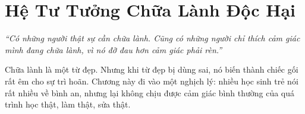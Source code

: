 \chapter{Hệ Tư Tưởng Chữa Lành Độc Hại}

\begin{center}
	\textit{\color{bookprimary}``Có những người thật sự cần chữa lành. Cũng có những người chỉ thích cảm giác mình đang chữa lành, vì nó đỡ đau hơn cảm giác phải rèn.''}
\end{center}

\ngancach

\begin{tcolorbox}[
	colback=booksecondary!8,
	colframe=booksecondary!40,
	arc=5pt,
	title={\bfseries Mở Chương},
	fonttitle=\bfseries\color{booksecondary}
]
Chữa lành là một từ đẹp. Nhưng khi từ đẹp bị dùng sai, nó biến thành chiếc gối rất êm cho sự trì hoãn. Chương này đi vào một nghịch lý: nhiều học sinh trẻ nói rất nhiều về bình an, nhưng lại không chịu được cảm giác bình thường của quá trình học thật, làm thật, sửa thật.
\end{tcolorbox}

